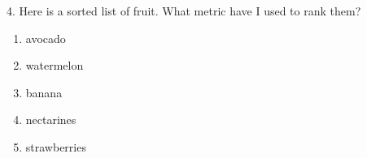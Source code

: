 \Large 4. Here is a sorted list of fruit. What metric have I used to rank them?
\begin{enumerate}
   \item avocado 
   \item watermelon 
   \item banana 
   \item nectarines 
   \item strawberries 
\end{enumerate}
